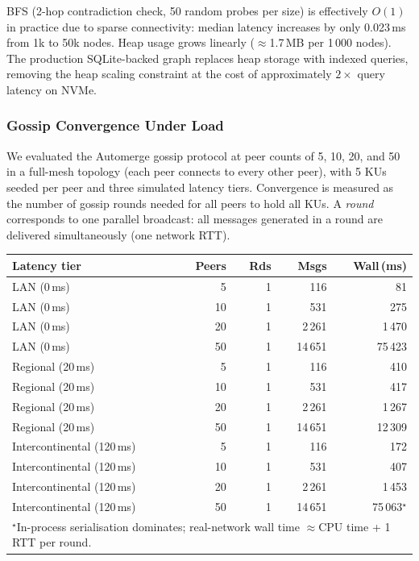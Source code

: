 \documentclass[10pt,twocolumn]{article}
\begin{document}
BFS (2-hop contradiction check, 50 random probes per size) is effectively
$O(1)$ in practice due to sparse connectivity: median latency increases by
only 0.023\,ms from 1k to 50k nodes. Heap usage grows linearly
($\approx$1.7\,MB per 1\,000 nodes). The production SQLite-backed graph
replaces heap storage with indexed queries, removing the heap scaling
constraint at the cost of approximately $2\times$ query latency on NVMe.

\subsubsection*{Gossip Convergence Under Load}

We evaluated the Automerge gossip protocol at peer counts of 5, 10, 20,
and 50 in a full-mesh topology (each peer connects to every other peer),
with 5 KUs seeded per peer and three simulated latency tiers. Convergence
is measured as the number of gossip rounds needed for all peers to hold
all KUs. A \emph{round} corresponds to one parallel broadcast: all messages
generated in a round are delivered simultaneously (one network RTT).

\begin{center}
\label{tab:gossip}
\small
\begin{tabular}{lrrrr}
\toprule
\textbf{Latency tier} & \textbf{Peers} & \textbf{Rds} & \textbf{Msgs} & \textbf{Wall\,(ms)} \\
\midrule
LAN (0\,ms)                &  5 & 1 &      116 &     81 \\
LAN (0\,ms)                & 10 & 1 &      531 &    275 \\
LAN (0\,ms)                & 20 & 1 &   2\,261 & 1\,470 \\
LAN (0\,ms)                & 50 & 1 &  14\,651 & 75\,423 \\
Regional (20\,ms)          &  5 & 1 &      116 &    410 \\
Regional (20\,ms)          & 10 & 1 &      531 &    417 \\
Regional (20\,ms)          & 20 & 1 &   2\,261 & 1\,267 \\
Regional (20\,ms)          & 50 & 1 &  14\,651 & 12\,309 \\
Intercontinental (120\,ms) &  5 & 1 &      116 &    172 \\
Intercontinental (120\,ms) & 10 & 1 &      531 &    407 \\
Intercontinental (120\,ms) & 20 & 1 &   2\,261 & 1\,453 \\
Intercontinental (120\,ms) & 50 & 1 &  14\,651 & 75\,063$^\star$ \\
\bottomrule
\multicolumn{5}{p{7cm}}{$^\star$In-process serialisation dominates; real-network wall time $\approx$CPU time + 1 RTT per round.}
\end{tabular}
\end{center}
\end{document}

